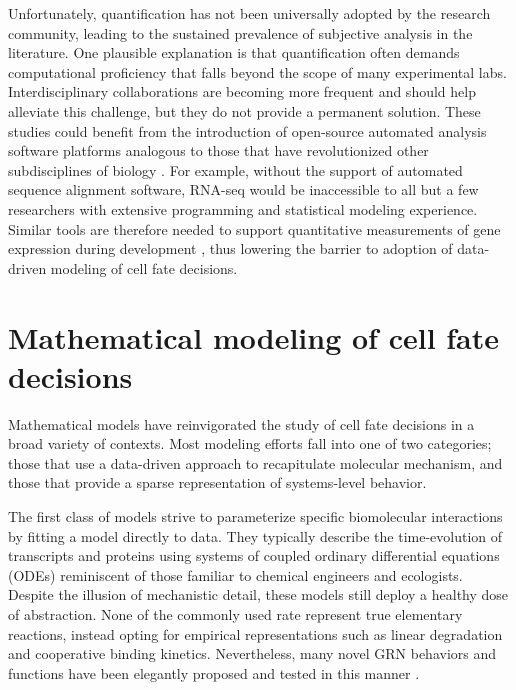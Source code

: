 Unfortunately, quantification has not been universally adopted by the research community, leading to the sustained prevalence of subjective analysis in the literature. One plausible explanation is that quantification often demands computational proficiency that falls beyond the scope of many experimental labs. Interdisciplinary collaborations are becoming more frequent and should help alleviate this challenge, but they do not provide a permanent solution. These studies could benefit from the introduction of open-source automated analysis software platforms analogous to those that have revolutionized other subdisciplines of biology \cite{Aghaeepour2013,Chen2015,Pyne2009,Bernstein2008,Hellemans2007,Langmead2012,Trapnell2009,Costes2004,Kelley2015,Carpenter2006,Paintdakhi2016,Schindelin2012,Sommer2011}. For example, without the support of automated sequence alignment software, RNA-seq would be inaccessible to all but a few researchers with extensive programming and statistical modeling experience. Similar tools are therefore needed to support quantitative measurements of gene expression during development \cite{Jug2014,Sbalzarini2016,Schindelin2015}, thus lowering the barrier to adoption of data-driven modeling of cell fate decisions.

\section{Mathematical modeling of cell fate decisions}

Mathematical models have reinvigorated the study of cell fate decisions in a broad variety of contexts. Most modeling efforts fall into one of two categories; those that use a data-driven approach to recapitulate molecular mechanism, and those that provide a sparse representation of systems-level behavior. 

The first class of models strive to parameterize specific biomolecular interactions by fitting a model directly to data. They typically describe the time-evolution of transcripts and proteins using systems of coupled ordinary differential equations (ODEs) reminiscent of those familiar to chemical engineers and ecologists. Despite the illusion of mechanistic detail, these models still deploy a healthy dose of abstraction. None of the commonly used rate represent true elementary reactions, instead opting for empirical representations such as linear degradation and cooperative binding kinetics. Nevertheless, many novel GRN behaviors and functions have been elegantly proposed and tested in this manner \cite{Barkai1997,Yu2008,Paulsen2011}. 

